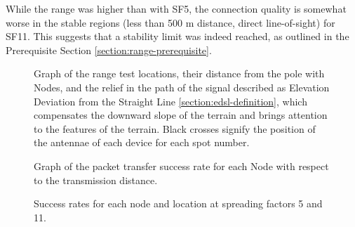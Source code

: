 While the range was higher than with SF5, the connection quality is somewhat worse in the stable regions (less than 500 m distance, direct line-of-sight) for SF11. This suggests that a stability limit was indeed reached, as outlined in the Prerequisite Section \ref{section:range-prerequisite}.

\begin{figure}[p]
    \centering
    \subfloat[SF11]{} \hfil
    \subfloat[SF5]{}
    \caption{\label{fig:range-relief}Graph of the range test locations, their distance from the pole with Nodes, and the relief in the path of the signal described as Elevation Deviation from the Straight Line \ref{section:edsl-definition}, which compensates the downward slope of the terrain and brings attention to the features of the terrain. Black crosses signify the position of the antennae of each device for each spot number.}
\end{figure}

\begin{figure}[p]
    \centering
    \subfloat[SF11]{} \hfil
    \subfloat[SF5]{}
    \caption{\label{fig:range-results}Graph of the packet transfer success rate for each Node with respect to the transmission distance.}
\end{figure}

\begin{figure}[p]
\begin{minipage}[t]{.45\textwidth}
    \vspace{0pt}
    
\end{minipage}
\begin{minipage}[t]{.45\textwidth}
    \vspace{0pt}
            
\end{minipage}
\caption{\label{table:range-results}Success rates for each node and location at spreading factors 5 and 11.}
\end{figure}

